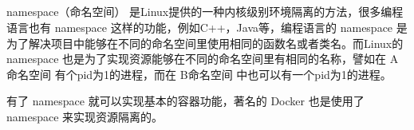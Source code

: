 \documentclass[../../../interview-questions.tex]{subfiles}
\begin{document}
\subsection{\color{red}{容器三把斧之Namespace原理与实现}}

namespace（命名空间） 是Linux提供的一种内核级别环境隔离的方法，很多编程语言也有 namespace 这样的功能，例如C++，Java等，编程语言的 namespace 是为了解决项目中能够在不同的命名空间里使用相同的函数名或者类名。而Linux的 namespace 也是为了实现资源能够在不同的命名空间里有相同的名称，譬如在 A命名空间 有个pid为1的进程，而在 B命名空间 中也可以有一个pid为1的进程。

有了 namespace 就可以实现基本的容器功能，著名的 Docker 也是使用了 namespace 来实现资源隔离的。
\end{document}
